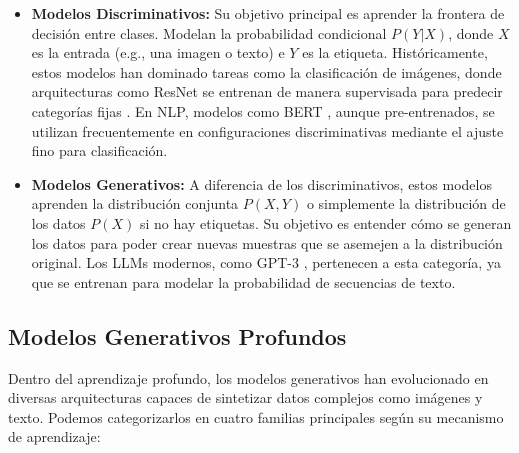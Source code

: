 \documentclass[11pt, a4paper]{article}
\begin{document}
\begin{itemize}
    \item \textbf{Modelos Discriminativos:} Su objetivo principal es aprender la frontera de decisión entre clases. Modelan la
    probabilidad condicional $P(Y|X)$, donde $X$ es la entrada (e.g., una imagen o texto) e $Y$ es la etiqueta. Históricamente,
    estos modelos han dominado tareas como la clasificación de imágenes, donde arquitecturas como ResNet se entrenan de manera
    supervisada para predecir categorías fijas \cite{radford_learning_nodate}. En NLP, modelos como BERT 
    \cite{devlin_bert_nodate}, aunque pre-entrenados, se utilizan frecuentemente en configuraciones discriminativas mediante
     el ajuste fino para clasificación.
    
    \item \textbf{Modelos Generativos:} A diferencia de los discriminativos, estos modelos aprenden la distribución conjunta
    $P(X,Y)$ o simplemente la distribución de los datos $P(X)$ si no hay etiquetas. Su objetivo es entender cómo se generan los
    datos para poder crear nuevas muestras que se asemejen a la distribución original. Los LLMs modernos, como GPT-3 
    \cite{brown_language_nodate}, pertenecen a esta categoría, ya que se entrenan para modelar la probabilidad de secuencias de texto.
\end{itemize}

\subsection{Modelos Generativos Profundos}

Dentro del aprendizaje profundo, los modelos generativos han evolucionado en diversas arquitecturas capaces de sintetizar datos
complejos como imágenes y texto. Podemos categorizarlos en cuatro familias principales según su mecanismo de aprendizaje:
\end{document}
